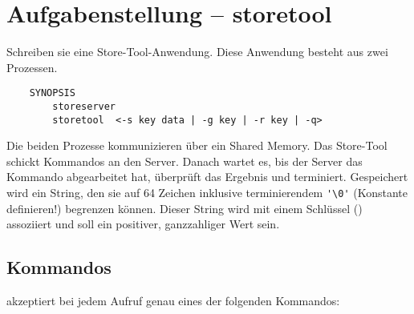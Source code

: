 




\section*{Aufgabenstellung -- storetool}

Schreiben sie eine Store-Tool-Anwendung. Diese Anwendung besteht aus zwei
Prozessen.

\begin{verbatim}
    SYNOPSIS
        storeserver
        storetool  <-s key data | -g key | -r key | -q>
\end{verbatim}

Die beiden Prozesse kommunizieren über ein Shared Memory. Das Store-Tool
schickt Kommandos an den Server. Danach wartet es, bis der Server das Kommando
abgearbeitet hat, überprüft das Ergebnis und terminiert.
Gespeichert wird ein String, den sie auf 64 Zeichen inklusive terminierendem
\verb_'\0'_ (Konstante definieren!) begrenzen können. Dieser String wird mit
einem Schlüssel () assoziiert und soll ein positiver, ganzzahliger
Wert sein.

\subsection*{Kommandos}

 akzeptiert bei jedem Aufruf genau eines der folgenden
Kommandos:


